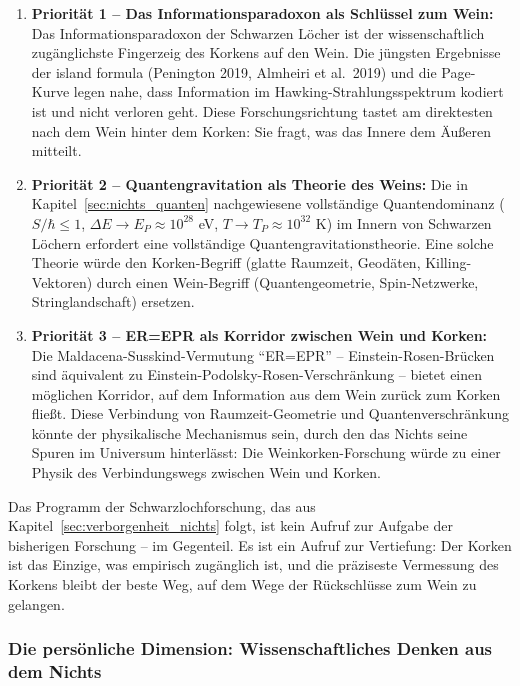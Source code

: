 ﻿\documentclass[12pt,a4paper]{report}
\begin{document}
\begin{enumerate}
	\item \textbf{Priorität 1 -- Das Informationsparadoxon als Schlüssel zum Wein:} Das Informationsparadoxon der Schwarzen Löcher ist der wissenschaftlich zugänglichste Fingerzeig des Korkens auf den Wein. Die jüngsten Ergebnisse der \glqq island formula\grqq{} (Penington 2019, Almheiri et al.\ 2019) und die Page-Kurve legen nahe, dass Information im Hawking-Strahlungsspektrum kodiert ist und nicht verloren geht. Diese Forschungsrichtung tastet am direktesten nach dem Wein hinter dem Korken: Sie fragt, was das Innere dem Äußeren mitteilt.

	\item \textbf{Priorität 2 -- Quantengravitation als Theorie des Weins:} Die in Kapitel~\ref{sec:nichts_quanten} nachgewiesene vollständige Quantendominanz ($S/\hbar \leq 1$, $\Delta E \to E_P \approx 10^{28}$ eV, $T \to T_P \approx 10^{32}$ K) im Innern von Schwarzen Löchern erfordert eine vollständige Quantengravitationstheorie. Eine solche Theorie würde den Korken-Begriff (glatte Raumzeit, Geodäten, Killing-Vektoren) durch einen Wein-Begriff (Quantengeometrie, Spin-Netzwerke, Stringlandschaft) ersetzen.

	\item \textbf{Priorität 3 -- ER=EPR als Korridor zwischen Wein und Korken:} Die Maldacena-Susskind-Vermutung ``ER=EPR'' -- Einstein-Rosen-Brücken sind äquiva\-lent zu Einstein-Podolsky-Rosen-Verschränkung -- bietet einen möglichen Korridor, auf dem Information aus dem Wein zurück zum Korken fließt. Diese Verbindung von Raumzeit-Geometrie und Quantenverschränkung könnte der physikalische Mechanismus sein, durch den das Nichts seine Spuren im Universum hinterlässt: Die Weinkorken-Forschung würde zu einer Physik des Verbindungswegs zwischen Wein und Korken.
\end{enumerate}

Das Programm der Schwarzlochforschung, das aus Kapitel~\ref{sec:verborgenheit_nichts} folgt, ist kein Aufruf zur Aufgabe der bisherigen Forschung -- im Gegenteil. Es ist ein Aufruf zur Vertiefung: Der Korken ist das Einzige, was empirisch zugänglich ist, und die präziseste Vermessung des Korkens bleibt der beste Weg, auf dem Wege der Rückschlüsse zum Wein zu gelangen.

\subsubsection{Die persönliche Dimension: Wissenschaftliches Denken aus dem Nichts}
\end{document}
